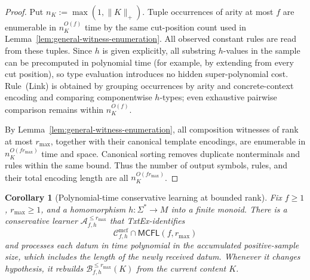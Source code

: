 \documentclass[11pt]{article}
\numberwithin{equation}{section}
\theoremstyle{plain}
\newtheorem{corollary}[theorem]{Corollary}
\theoremstyle{definition}
\theoremstyle{remark}
\newcommand{\Cmcf}[2]{\mathcal{C}^{\mathrm{mcf}}_{#1,#2}}
\begin{document}
\begin{proof}
Put \(n_K:=\max(1,\|K\|_+)\).  Tuple occurrences of arity at most \(f\) are
enumerable in \(n_K^{O(f)}\) time by the same cut-position count used in
Lemma~\ref{lem:general-witness-enumeration}.  All observed constant rules are
read from these tuples.  Since $h$ is given explicitly, all substring $h$-values in
the sample can be precomputed in polynomial time (for example, by extending
from every cut position), so type evaluation introduces no hidden
super-polynomial cost.  Rule~(Link) is obtained by grouping
occurrences by arity and concrete-context encoding and comparing componentwise
\(h\)-types; even exhaustive pairwise comparison remains within
\(n_K^{O(f)}\).

By Lemma~\ref{lem:general-witness-enumeration}, all composition
witnesses of rank at most \(r_{\max}\), together with their canonical template
encodings, are enumerable in \(n_K^{O(f r_{\max})}\) time and space.  Canonical sorting
removes duplicate nonterminals and rules within the same bound.  Thus the
number of output symbols, rules, and their total encoding length are all
\(n_K^{O(f r_{\max})}\).
\end{proof}

\begin{corollary}[Polynomial-time conservative learning at bounded rank]
\label{cor:capped-gold-poly}
Fix $f\ge1$, $r_{\max}\ge1$, and a homomorphism
$h:\Sigma^*\to M$ into a finite monoid.  There is a conservative learner
$\mathcal A_{f,h}^{\le r_{\max}}$ that TxtEx-identifies
\[
  \Cmcf{f}{h}\cap \mathsf{MCFL}(f,r_{\max})
\]
and processes each datum in time polynomial in the accumulated positive-sample
size, which includes the length of the newly received datum.  Whenever it changes hypothesis, it rebuilds
$\mathcal B_{f,h}^{\le r_{\max}}(K)$ from the current content $K$.
\end{corollary}
\end{document}
